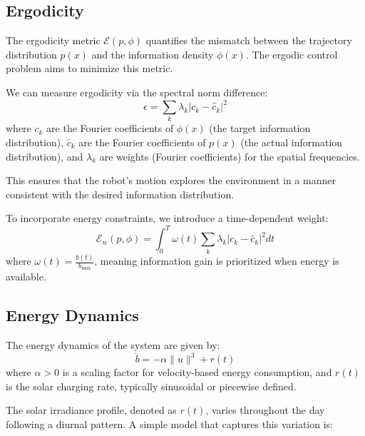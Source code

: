 \documentclass{article}
\begin{document}
\subsection{Ergodicity}
The ergodicity metric $\mathcal{E}(p, \phi)$ quantifies the mismatch between the trajectory distribution $p(x)$ and the information density $\phi(x)$. The ergodic control problem aims to minimize this metric.

We can measure ergodicity via the spectral norm difference:
\begin{equation}
    \epsilon = \sum_k \lambda_k \left| c_k - \hat{c}_k \right|^2
\end{equation}
where $c_k$ are the Fourier coefficients of $\phi(x)$ (the target information distribution), $\hat{c}_k$ are the Fourier coefficients of $p(x)$ (the actual information distribution), and $\lambda_k$ are weights (Fourier coefficients) for the spatial frequencies.


\begin{center}
\begin{tcolorbox}[colback=gray!30, colframe=white, width=\textwidth, boxrule=0pt, arc=0pt, auto outer arc]
    This ensures that the robot's motion explores the environment in a manner consistent with the desired information distribution.
\end{tcolorbox}
\end{center}

To incorporate energy constraints, we introduce a time-dependent weight:
\begin{equation}
\mathcal{E}_w(p, \phi) = \int_0^T \omega(t) \sum_k \lambda_k \left| c_k - \hat{c}_k \right|^2 dt
\end{equation}
where $\omega(t) = \frac{b(t)}{b_{\max}}$, meaning information gain is prioritized when energy is available.

\subsection{Energy Dynamics}
The energy dynamics of the system are given by:
\begin{equation}
    \dot{b} = - \alpha \|u\|^3 + r(t)
\end{equation}
where $\alpha > 0$ is a scaling factor for velocity-based energy consumption, and $r(t)$ is the solar charging rate, typically sinusoidal or piecewise defined.

The solar irradiance profile, denoted as \( r(t) \), varies throughout the day following a diurnal pattern. A simple model that captures this variation is:
\end{document}
